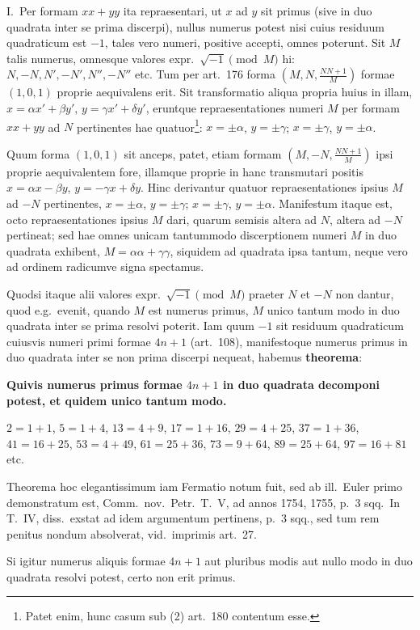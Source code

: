 \documentclass[12pt,a4paper]{article}
\theoremstyle{plain}
\theoremstyle{definition}
\theoremstyle{remark}
\begin{document}
I.\ Per formam $xx+yy$ ita repraesentari, ut $x$ ad $y$ sit primus (sive in duo quadrata inter se prima discerpi), nullus numerus potest nisi cuius residuum quadraticum est $-1$, tales vero numeri, positive accepti, omnes poterunt. Sit $M$ talis numerus, omnesque valores expr.\ $\sqrt{-1}\pmod{M}$ hi: $N,-N,N',-N',N'',-N''$ etc. Tum per art.\ 176 forma $(M,N,\frac{NN+1}{M})$ formae $(1,0,1)$ proprie aequivalens erit. Sit transformatio aliqua propria huius in illam, $x=\alpha x'+\beta y'$, $y=\gamma x'+\delta y'$, eruntque repraesentationes numeri $M$ per formam $xx+yy$ ad $N$ pertinentes hae quatuor\footnote{Patet enim, hunc casum sub (2) art.\ 180 contentum esse.}: $x=\pm\alpha$, $y=\pm\gamma$; $x=\pm\gamma$, $y=\pm\alpha$.

Quum forma $(1,0,1)$ sit anceps, patet, etiam formam $(M,-N,\frac{NN+1}{M})$ ipsi proprie aequivalentem fore, illamque proprie in hanc transmutari positis $x=\alpha x-\beta y$, $y=-\gamma x+\delta y$. Hinc derivantur quatuor repraesentationes ipsius $M$ ad $-N$ pertinentes, $x=\pm\alpha$, $y=\pm\gamma$; $x=\pm\gamma$, $y=\pm\alpha$. Manifestum itaque est, octo repraesentationes ipsius $M$ dari, quarum semisis altera ad $N$, altera ad $-N$ pertineat; sed hae omnes unicam tantummodo discerptionem numeri $M$ in duo quadrata exhibent, $M=\alpha\alpha+\gamma\gamma$, siquidem ad quadrata ipsa tantum, neque vero ad ordinem radicumve signa spectamus.

Quodsi itaque alii valores expr.\ $\sqrt{-1}\pmod{M}$ praeter $N$ et $-N$ non dantur, quod e.g.\ evenit, quando $M$ est numerus primus, $M$ unico tantum modo in duo quadrata inter se prima resolvi poterit. Iam quum $-1$ sit residuum quadraticum cuiusvis numeri primi formae $4n+1$ (art.\ 108), manifestoque numerus primus in duo quadrata inter se non prima discerpi nequeat, habemus \textbf{theorema}:

\textbf{Quivis numerus primus formae $4n+1$ in duo quadrata decomponi potest, et quidem unico tantum modo.}

$2=1+1$, $5=1+4$, $13=4+9$, $17=1+16$, $29=4+25$, $37=1+36$, $41=16+25$, $53=4+49$, $61=25+36$, $73=9+64$, $89=25+64$, $97=16+81$ etc.

Theorema hoc elegantissimum iam Fermatio notum fuit, sed ab ill.\ Euler primo demonstratum est, Comm.\ nov.\ Petr.\ T.\ V, ad annos 1754, 1755, p.\ 3 sqq.\ In T.\ IV, diss.\ exstat ad idem argumentum pertinens, p.\ 3 sqq., sed tum rem penitus nondum absolverat, vid.\ imprimis art.\ 27.

Si igitur numerus aliquis formae $4n+1$ aut pluribus modis aut nullo modo in duo quadrata resolvi potest, certo non erit primus.
\end{document}

